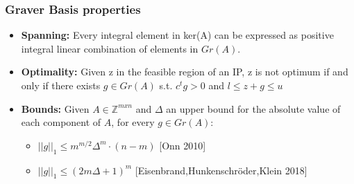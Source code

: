 \documentclass{beamer}
\begin{document}
    \begin{frame}
        \frametitle{Graver Basis properties}
        \begin{itemize}
            \justifying
            \item \textbf{Spanning:} Every integral element in ker(A) can be expressed as positive integral linear combination of elements in $Gr(A)$.
        \end{itemize}
        
        \vspace{0.5cm}
        \begin{itemize}
            \justifying
            \item \textbf{Optimality:} Given z in the feasible region of an IP, z is not optimum if and only if there exists $g \in Gr(A)$ s.t. $c^tg > 0$ and $l \leq z + g \leq u$
        \end{itemize}
        
        
        \vspace{0.5cm}
        \begin{itemize}
            \justifying
            \item \textbf{Bounds:} Given $A \in \mathbb{Z}^{mxn}$ and $\Delta$ an upper bound for the absolute value of each component of $A$, for every $g \in Gr(A)$:
            \begin{itemize}
                \item $||g||_1 \leq m^{m/2}\Delta^m\cdot(n - m)$ \hspace{10pt}[Onn 2010]
                \item $||g||_1 \leq (2m \Delta + 1)^m$ \hspace{35pt}[Eisenbrand,Hunkenschröder,Klein 2018]
            \end{itemize}
        \end{itemize}

        
    \end{frame}
    
\end{document}
